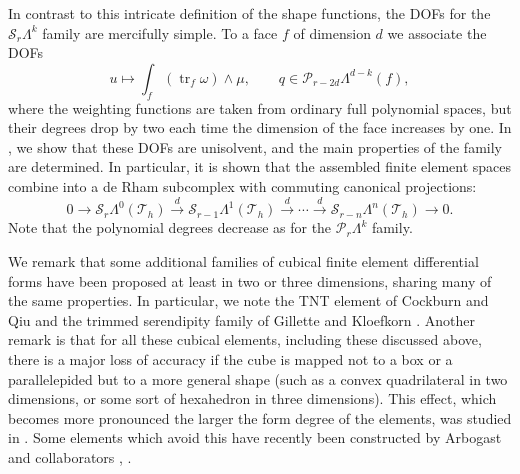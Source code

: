{In contrast to this intricate definition of the shape functions, the DOFs for the $\mathcal S_r\Lambda^k$ family are mercifully simple. To a face $f$ of dimension $d$ we associate the DOFs}
\[
u\mapsto\int_f(\operatorname{tr}_f\omega)\wedge\mu,\qquad q\in\mathcal P_{r-2d}\Lambda^{d-k}(f),
\]
{where the weighting functions are taken from ordinary full polynomial spaces, but their degrees drop by two each time the dimension of the face increases by one. In , we show that these DOFs are unisolvent, and the main properties of the family are determined. In particular, it is shown that the assembled finite element spaces combine into a de Rham subcomplex with commuting canonical projections:}
\[
0\to\mathcal S_r\Lambda^0(\mathcal T_h)\xrightarrow{d}\mathcal S_{r-1}\Lambda^1(\mathcal T_h)\xrightarrow{d}\cdots\xrightarrow{d}\mathcal S_{r-n}\Lambda^n(\mathcal T_h)\to0.
\]
{Note that the polynomial degrees decrease as for the $\mathcal P_r\Lambda^k$ family.}

{We remark that some additional families of cubical finite element differential forms have been proposed at least in two or three dimensions, sharing many of the same properties. In particular, we note the TNT element of Cockburn and Qiu  and the trimmed serendipity family of Gillette and Kloefkorn . Another remark is that for all these cubical elements, including these discussed above, there is a major loss of accuracy if the cube is mapped not to a box or a parallelepided but to a more general shape (such as a convex quadrilateral in two dimensions, or some sort of hexahedron in three dimensions). This effect, which becomes more pronounced the larger the form degree of the elements, was studied in . Some elements which avoid this have recently been constructed by Arbogast and collaborators , .}
